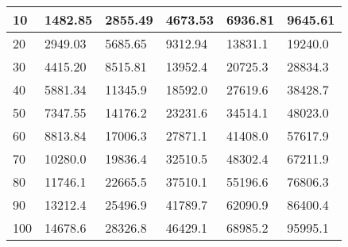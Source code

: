 \begin{table}[h]
\begin{tabular}{|l|l|l|l|l|l|}
10                                                                         & 1482.85         & 2855.49          & 4673.53          & 6936.81          & 9645.61          \\ \hline
20                                                                         & 2949.03         & 5685.65          & 9312.94          & 13831.1          & 19240.0          \\ \hline
30                                                                         & 4415.20         & 8515.81          & 13952.4          & 20725.3          & 28834.3          \\ \hline
40                                                                         & 5881.34         & 11345.9          & 18592.0          & 27619.6          & 38428.7          \\ \hline
50                                                                         & 7347.55         & 14176.2          & 23231.6          & 34514.1          & 48023.0          \\ \hline
60                                                                         & 8813.84         & 17006.3          & 27871.1          & 41408.0          & 57617.9          \\ \hline
70                                                                         & 10280.0         & 19836.4          & 32510.5          & 48302.4          & 67211.9          \\ \hline
80                                                                         & 11746.1         & 22665.5          & 37510.1          & 55196.6          & 76806.3          \\ \hline
90                                                                         & 13212.4         & 25496.9          & 41789.7          & 62090.9          & 86400.4          \\ \hline
100                                                                        & 14678.6         & 28326.8          & 46429.1          & 68985.2          & 95995.1          \\ \hline
\end{tabular}
\end{table}


